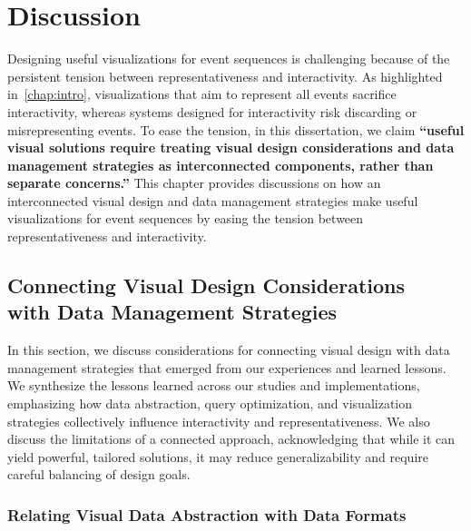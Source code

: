 \chapter{Discussion}
\label{chap:discussion}

\begin{refsection}
Designing useful visualizations for event sequences is challenging because of the persistent tension between representativeness and interactivity. As highlighted in~\autoref{chap:intro}, visualizations that aim to represent all events sacrifice interactivity, whereas systems designed for interactivity risk discarding or misrepresenting events. To ease the tension, in this dissertation, we claim \textbf{``useful visual solutions require treating visual design considerations and data management strategies as interconnected components, rather than separate concerns.''} This chapter provides discussions on how an interconnected visual design and data management strategies make useful visualizations for event sequences by easing the tension between representativeness and interactivity.


\section[Connecting Visual Design Considerations with Data Management Strategies]{Connecting Visual Design Considerations \\ with Data Management Strategies}

In this section, we discuss considerations for connecting visual design with data management strategies that emerged from our experiences and learned lessons. We synthesize the lessons learned across our studies and implementations, emphasizing how data abstraction, query optimization, and visualization strategies collectively influence interactivity and representativeness. We also discuss the limitations of a connected approach, acknowledging that while it can yield powerful, tailored solutions, it may reduce generalizability and require careful balancing of design goals.

\subsection{Relating Visual Data Abstraction with Data Formats}
\label{subsec:abstraction_format}


\end{refsection}
